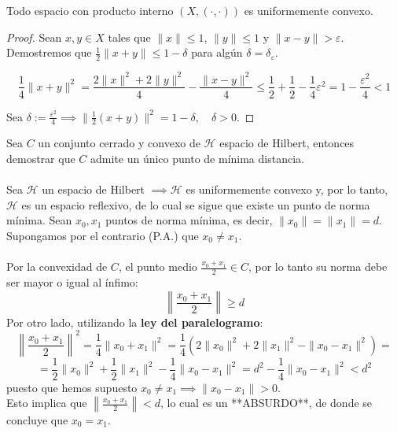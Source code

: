 \begin{teo}
    Todo espacio con producto interno $(X, (\cdot, \cdot))$ es uniformemente convexo.
\begin{proof}
    Sean $x, y \in X$ tales que $\|x\| \le 1$, $\|y\| \le 1$ y $\|x - y\| > \varepsilon$. Demostremos que $\frac{1}{2} \|x + y\| \le 1 - \delta$ para algún $\delta = \delta_\varepsilon$.

    $$\frac{1}{4} \|x + y\|^2 = \frac{2\|x\|^2 + 2\|y\|^2}{4} - \frac{\|x - y\|^2}{4} \le \frac{1}{2} + \frac{1}{2} - \frac{1}{4} \varepsilon^2 = 1 - \frac{\varepsilon^2}{4} < 1$$

    Sea $\delta := \frac{\varepsilon^2}{4} \implies \|\frac{1}{2}(x + y)\|^2 = 1 - \delta, \quad \delta > 0$.
\end{proof}
\end{teo}

\begin{ejercicio}
    Sea $C$ un conjunto cerrado y convexo de $\mathcal{H}$ espacio de Hilbert, entonces demostrar que $C$ admite un único punto de mínima distancia. \\ \\
    
    \noindent
    Sea $\mathcal{H}$ un espacio de Hilbert $\implies \mathcal{H}$ es uniformemente convexo y, por lo tanto, $\mathcal{H}$ es un espacio reflexivo, de lo cual se sigue que existe un punto de norma mínima. Sean $x_0, x_1$ puntos de norma mínima, es decir, $\|x_0\| = \|x_1\| = d$. Supongamos por el contrario (P.A.) que $x_0 \neq x_1$. \\ \\
    \noindent
    Por la convexidad de $C$, el punto medio $\frac{x_0 + x_1}{2} \in C$, por lo tanto su norma debe ser mayor o igual al ínfimo:
    \[ \left\| \frac{x_0 + x_1}{2} \right\| \ge d \]
    Por otro lado, utilizando la \textbf{ley del paralelogramo}:
    \[ \left\| \frac{x_0 + x_1}{2} \right\|^2 = \frac{1}{4} \|x_0 + x_1\|^2 = \frac{1}{4} \left( 2\|x_0\|^2 + 2\|x_1\|^2 - \|x_0 - x_1\|^2 \right) = \]
    \[ = \frac{1}{2} \|x_0\|^2 + \frac{1}{2} \|x_1\|^2 - \frac{1}{4} \|x_0 - x_1\|^2 = d^2 - \frac{1}{4} \|x_0 - x_1\|^2 < d^2 \]
    puesto que hemos supuesto $x_0 \neq x_1 \implies \|x_0 - x_1\| > 0$. \\
    \noindent
    Esto implica que $\left\| \frac{x_0 + x_1}{2} \right\| < d$, lo cual es un **ABSURDO**, de donde se concluye que $x_0 = x_1$. \\
\end{ejercicio}

